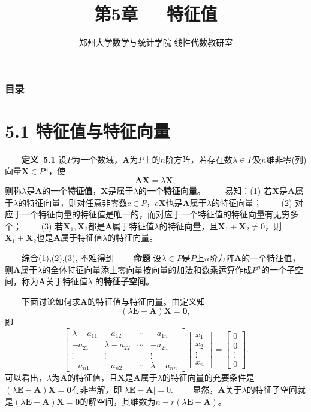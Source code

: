\documentclass[compress,mathserif,cjk]{beamer}
\title{\textsc{第5章\ \ \ 特征值}}
\author{郑州大学数学与统计学院 线性代数教研室}
\date{}
\theoremstyle{remark}
\numberwithin{equation}{section}
\newcommand{\hei}{\bf}      %
\begin{document}
\begin{CJK}{UTF8}{gbsn}
\frame{\titlepage}

\begin{frame}\frametitle{目录}
 \tableofcontents
\end{frame}

\section[5.1]{5.1 特征值与特征向量}

\begin{frame}
 \ \ \ \ {\hei 定义~5.1} 设$P$为一个数域，$\bm A$为$P$上的$n$阶方阵，若存在数$\lambda\in P$及$n$维非零(列)向量$\bm X\in P^n$，使
 $$\bm{AX}=\lambda\bm X,$$
 则称$\lambda$是$\bm A$的一个{\hei 特征值}，$\bm X$是属于$\lambda$的一个{\hei 特征向量}。
 \pause\vskip 10pt
 \ \ \ \ 易知：(1) 若$\bm X$是$\bm A$属于$\lambda$的特征向量，则对任意非零数$c\in P$，$c\bm X$也是$\bm A$属于$\lambda$的特征向量；
 \vskip 5pt
 \ \ \ \ (2) 对应于一个特征向量的特征值是唯一的，而对应于一个特征值的特征向量有无穷多个；
 \vskip 5pt
 \ \ \ \ (3) 若$\bm X_1,\bm X_2$都是$\bm A$属于特征值$\lambda$的特征向量，且$\bm X_1+\bm X_2\neq 0$，则$\bm X_1+\bm X_2$也是$\bm A$属于特征值$\lambda$的特征向量。
\end{frame}

\begin{frame}
 \ \ \ \ 综合(1),(2),(3), 不难得到
 \vskip 5pt
 \ \ \ \  {\hei 命题} 设$\lambda\in P$是$P$上$n$阶方阵$\bm A$的一个特征值，则$\bm A$属于$\lambda$的全体特征向量添上零向量按向量的加法和数乘运算作成$P^n$的一个子空间，称为$\bm A$关于特征值$\lambda$ 的{\hei 特征子空间}。

\end{frame}

\begin{frame}
 \ \ \ \ 下面讨论如何求$\bm A$的特征值与特征向量。由定义知
 $$(\lambda\bm E-\bm A)\bm X=\bm 0,$$
 即
 $$\left[\begin{matrix}\lambda-a_{11}&-a_{12}&\cdots&-a_{1n}\\-a_{21}&\lambda-a_{22}&\cdots&-a_{2n}\\\vdots&\vdots&&\vdots\\-a_{n1}&-a_{n2}&\cdots&\lambda-a_{nn}\end{matrix}\right]
 \left[\begin{matrix}x_1\\x_2\\\vdots\\x_n\end{matrix}\right]= \left[\begin{matrix}0\\0\\\vdots\\0\end{matrix}\right].$$
 \pause\vskip 5pt
 可以看出，$\lambda$为$\bm A$的特征值，且$\bm X$是$\bm A$属于$\lambda$的特征向量的充要条件是$(\lambda\bm E-\bm A)\bm X=\bm 0$有非零解，即$|\lambda\bm E-\bm A|=0$.
 \pause\vskip 5pt
 \ \ \ \ 显然，$\bm A$关于$\lambda$的特征子空间就是$(\lambda\bm E-\bm A)\bm X=\bm 0$的解空间，其维数为$n-r(\lambda\bm E-\bm A)$。


\end{frame}
\end{CJK}
\end{document}
